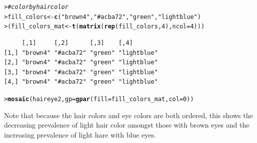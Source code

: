 \documentclass[10pt,krantz2]{krantz}\usepackage[]{graphicx}\usepackage[]{color}
\makeatletter
\newcommand{\hlnum}[1]{\textcolor[rgb]{0.686,0.059,0.569}{#1}}%
\newcommand{\hlstr}[1]{\textcolor[rgb]{0.192,0.494,0.8}{#1}}%
\newcommand{\hlcom}[1]{\textcolor[rgb]{0.678,0.584,0.686}{\textit{#1}}}%
\newcommand{\hlstd}[1]{\textcolor[rgb]{0.345,0.345,0.345}{#1}}%
\newcommand{\hlkwb}[1]{\textcolor[rgb]{0.69,0.353,0.396}{#1}}%
\newcommand{\hlkwc}[1]{\textcolor[rgb]{0.333,0.667,0.333}{#1}}%
\newcommand{\hlkwd}[1]{\textcolor[rgb]{0.737,0.353,0.396}{\textbf{#1}}}%
\newenvironment{kframe}{%
 \def\at@end@of@kframe{}%
 \ifinner\ifhmode%
  \def\at@end@of@kframe{\end{minipage}}%
  \begin{minipage}{\columnwidth}%
 \fi\fi%
 \def\FrameCommand##1{\hskip\@totalleftmargin \hskip-\fboxsep
 \colorbox{shadecolor}{##1}\hskip-\fboxsep
     \hskip-\linewidth \hskip-\@totalleftmargin \hskip\columnwidth}%
 \MakeFramed {\advance\hsize-\width
   \@totalleftmargin\z@ \linewidth\hsize
   \@setminipage}}%
 {\par\unskip\endMakeFramed%
 \at@end@of@kframe}
\newenvironment{knitrout}{}{} %
\renewenvironment{knitrout}{\small\renewcommand{\baselinestretch}{.85}}{} %
\makeatother
\begin{document}
\begin{knitrout}
\color{fgcolor}\begin{kframe}
\begin{alltt}
\hlstd{> }\hlcom{# color by hair color}
\hlstd{> }\hlstd{fill_colors} \hlkwb{<-} \hlkwd{c}\hlstd{(}\hlstr{"brown4"}\hlstd{,} \hlstr{"#acba72"}\hlstd{,} \hlstr{"green"}\hlstd{,} \hlstr{"lightblue"}\hlstd{)}
\hlstd{> }\hlstd{(fill_colors_mat} \hlkwb{<-} \hlkwd{t}\hlstd{(}\hlkwd{matrix}\hlstd{(}\hlkwd{rep}\hlstd{(fill_colors,} \hlnum{4}\hlstd{),} \hlkwc{ncol} \hlstd{=} \hlnum{4}\hlstd{)))}
\end{alltt}
\begin{verbatim}
     [,1]     [,2]      [,3]    [,4]       
[1,] "brown4" "#acba72" "green" "lightblue"
[2,] "brown4" "#acba72" "green" "lightblue"
[3,] "brown4" "#acba72" "green" "lightblue"
[4,] "brown4" "#acba72" "green" "lightblue"
\end{verbatim}
\begin{alltt}
\hlstd{> }\hlkwd{mosaic}\hlstd{(haireye2,} \hlkwc{gp} \hlstd{=} \hlkwd{gpar}\hlstd{(}\hlkwc{fill} \hlstd{= fill_colors_mat,} \hlkwc{col} \hlstd{=} \hlnum{0}\hlstd{))}
\end{alltt}
\end{kframe}
\end{knitrout}
\noindent Note that because the hair colors and eye colors are both ordered,
this shows the decreasing prevalence of light hair color amongst those with brown eyes
and the increasing prevalence of light hare with blue eyes.
\end{document}
